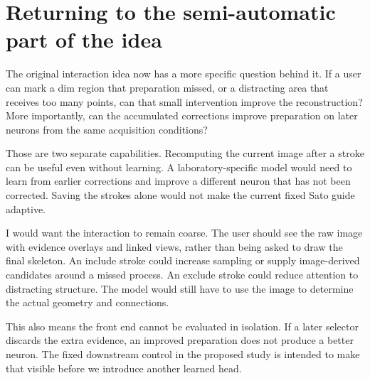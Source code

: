 \documentclass[11pt,a4paper]{article}
\begin{document}
\section{Returning to the semi-automatic part of the idea}
The original interaction idea now has a more specific question behind it. If a user can mark a dim region that preparation missed, or a distracting area that receives too many points, can that small intervention improve the reconstruction? More importantly, can the accumulated corrections improve preparation on later neurons from the same acquisition conditions?

Those are two separate capabilities. Recomputing the current image after a stroke can be useful even without learning. A laboratory-specific model would need to learn from earlier corrections and improve a different neuron that has not been corrected. Saving the strokes alone would not make the current fixed Sato guide adaptive.

I would want the interaction to remain coarse. The user should see the raw image with evidence overlays and linked views, rather than being asked to draw the final skeleton. An include stroke could increase sampling or supply image-derived candidates around a missed process. An exclude stroke could reduce attention to distracting structure. The model would still have to use the image to determine the actual geometry and connections.

This also means the front end cannot be evaluated in isolation. If a later selector discards the extra evidence, an improved preparation does not produce a better neuron. The fixed downstream control in the proposed study is intended to make that visible before we introduce another learned head.
\end{document}

